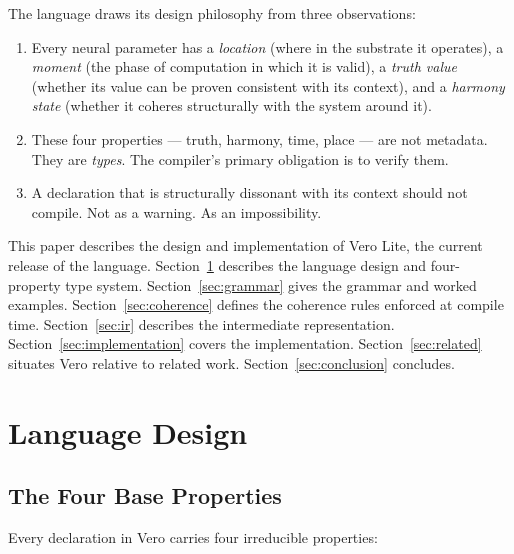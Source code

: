 \documentclass[11pt,a4paper]{article}
\begin{document}
The language draws its design philosophy from three observations:

\begin{enumerate}
  \item Every neural parameter has a \emph{location} (where in the substrate it operates),
        a \emph{moment} (the phase of computation in which it is valid), a \emph{truth value}
        (whether its value can be proven consistent with its context), and a \emph{harmony
        state} (whether it coheres structurally with the system around it).

  \item These four properties --- truth, harmony, time, place --- are not metadata.
        They are \emph{types}. The compiler's primary obligation is to verify them.

  \item A declaration that is structurally dissonant with its context should not compile.
        Not as a warning. As an impossibility.
\end{enumerate}

This paper describes the design and implementation of Vero Lite, the current release of the
language. Section~\ref{sec:design} describes the language design and four-property type system.
Section~\ref{sec:grammar} gives the grammar and worked examples. Section~\ref{sec:coherence}
defines the coherence rules enforced at compile time. Section~\ref{sec:ir} describes the
intermediate representation. Section~\ref{sec:implementation} covers the implementation.
Section~\ref{sec:related} situates Vero relative to related work.
Section~\ref{sec:conclusion} concludes.

\section{Language Design}
\label{sec:design}

\subsection{The Four Base Properties}

Every declaration in Vero carries four irreducible properties:
\end{document}
